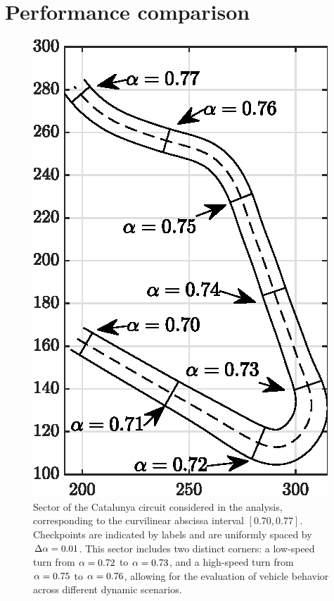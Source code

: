 \section{Performance comparison} 
\label{sec:performance_comparison}

\begin{figure}
	\centering
	\includegraphics{Fig/track.eps}
	\caption{Sector of the Catalunya circuit considered in the analysis, corresponding to the curvilinear abscissa interval $\left[0.70, 0.77\right]$. Checkpoints are indicated by labels and are uniformly spaced by $\Delta\alpha=0.01$. This sector includes two distinct corners: a low-speed turn from $\alpha = 0.72$ to $\alpha = 0.73$, and a high-speed turn from $\alpha = 0.75$ to $\alpha = 0.76$, allowing for the evaluation of vehicle behavior across different dynamic scenarios.}
	\label{fig:track}
\end{figure}

